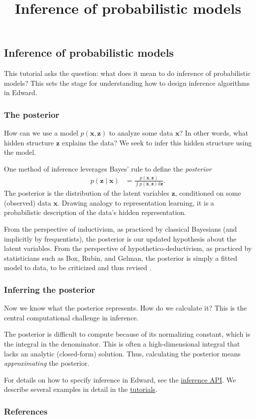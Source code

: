 \title{Inference of probabilistic models}

\subsection{Inference of probabilistic models}

This tutorial asks the question: what does it mean to do inference of
probabilistic models? This sets the stage for understanding how to
design inference algorithms in Edward.

\subsubsection{The posterior}

How can we use a model $p(\mathbf{x}, \mathbf{z})$ to analyze some
data $\mathbf{x}$? In other words, what hidden structure $\mathbf{z}$
explains the data? We seek to infer this hidden structure using the
model.

One method of inference leverages Bayes' rule to define the
\emph{posterior}
\begin{align*}
  p(\mathbf{z} \mid \mathbf{x})
  &=
  \frac{p(\mathbf{x}, \mathbf{z})}{\int p(\mathbf{x}, \mathbf{z}) \text{d}\mathbf{z}}.
\end{align*}
The posterior is the distribution of the latent variables
$\mathbf{z}$, conditioned on some (observed) data $\mathbf{x}$.
Drawing analogy to representation learning, it is a probabilistic
description of the data's hidden representation.

From the perspective of inductivism, as practiced by classical
Bayesians (and implicitly by frequentists),
the posterior is our updated hypothesis about the latent variables.
From the perspective of hypothetico-deductivism, as practiced by
statisticians such as Box, Rubin, and Gelman, the posterior is simply
a fitted model to data, to be criticized and thus revised
\citep{box1982apology,gelman2013philosophy}.

\subsubsection{Inferring the posterior}

Now we know what the posterior represents. How do we calculate it? This is the
central computational challenge in inference.

The posterior is difficult to compute because of its normalizing
constant, which is the integral in the denominator.
This is often a high-dimensional integral that lacks an analytic (closed-form)
solution. Thus, calculating the posterior means \emph{approximating} the
posterior.

For details on how to specify inference in Edward, see the
\href{/api/inference}{inference API}. We describe several examples in
detail in the \href{/tutorials/}{tutorials}.


\subsubsection{References}\label{references}

